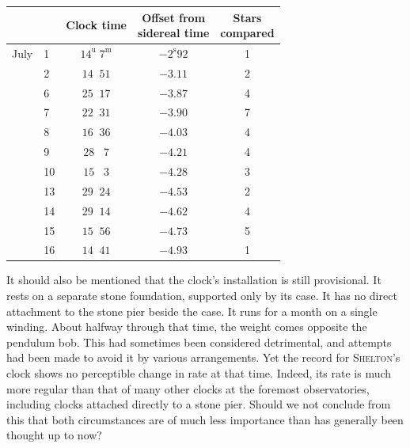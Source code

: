 \begin{center}
\begin{tabular}{ll|c|c|c}
 & & Clock time & \shortstack{Offset from\\sidereal time} & \shortstack{Stars\\compared} \\
\hline
July & 1 & $14^{\mathrm u}\;7^{\mathrm m}$ & $-2^{\mathrm s}92$ & 1 \\
 & 2 & $14\;\;51$ & $-3.11$ & 2 \\
 & 6 & $25\;\;17$ & $-3.87$ & 4 \\
 & 7 & $22\;\;31$ & $-3.90$ & 7 \\
 & 8 & $16\;\;36$ & $-4.03$ & 4 \\
 & 9 & $28\;\;\;7$ & $-4.21$ & 4 \\
 & 10 & $15\;\;\;3$ & $-4.28$ & 3 \\
 & 13 & $29\;\;24$ & $-4.53$ & 2 \\
 & 14 & $29\;\;14$ & $-4.62$ & 4 \\
 & 15 & $15\;\;56$ & $-4.73$ & 5 \\
 & 16 & $14\;\;41$ & $-4.93$ & 1 \\
\end{tabular}
\end{center}

\par\indent It should also be mentioned that the clock’s installation is still provisional. It rests on a separate stone foundation, supported only by its case. It has no direct attachment to the stone pier beside the case. It runs for a month on a single winding. About halfway through that time, the weight comes opposite the pendulum bob. This had sometimes been considered detrimental, and attempts had been made to avoid it by various arrangements. Yet the record for \textsc{Shelton}’s clock shows no perceptible change in rate at that time. Indeed, its rate is much more regular than that of many other clocks at the foremost observatories, including clocks attached directly to a stone pier. Should we not conclude from this that both circumstances are of much less importance than has generally been thought up to now?
